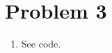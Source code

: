 \documentclass{article}
\begin{document}

\section*{Problem 3}
\begin{enumerate}[label=(\roman*)]
\item See code.


\end{enumerate}
\end{document}
